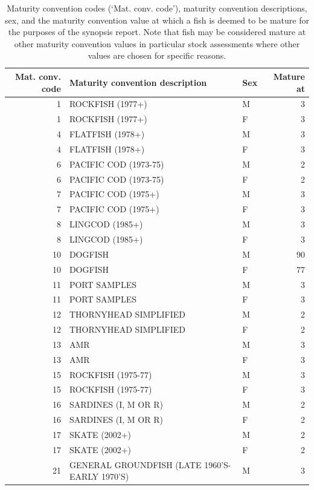 \documentclass[11pt]{book}\usepackage[]{graphicx}\usepackage[]{color}
\begin{document}
\begin{table}[ht]
\centering
\caption{Maturity convention codes (`Mat. conv. code'), maturity convention descriptions, sex, and the maturity convention value at which a fish is deemed to be mature for the purposes of the synopsis report. Note that fish may be considered mature at other maturity convention values in particular stock assessments where other values are chosen for specific reasons.} 
\begin{tabular}{rllr}
  \toprule
Mat. conv. code & Maturity convention description & Sex & Mature at \\ 
  \midrule
  1 & ROCKFISH (1977+) & M &   3 \\ 
    1 & ROCKFISH (1977+) & F &   3 \\ 
    4 & FLATFISH (1978+) & M &   3 \\ 
    4 & FLATFISH (1978+) & F &   3 \\ 
    6 & PACIFIC COD (1973-75) & M &   2 \\ 
    6 & PACIFIC COD (1973-75) & F &   2 \\ 
    7 & PACIFIC COD (1975+) & M &   3 \\ 
    7 & PACIFIC COD (1975+) & F &   3 \\ 
    8 & LINGCOD (1985+) & M &   3 \\ 
    8 & LINGCOD (1985+) & F &   3 \\ 
   10 & DOGFISH & M &  90 \\ 
   10 & DOGFISH & F &  77 \\ 
   11 & PORT SAMPLES & M &   3 \\ 
   11 & PORT SAMPLES & F &   3 \\ 
   12 & THORNYHEAD SIMPLIFIED & M &   2 \\ 
   12 & THORNYHEAD SIMPLIFIED & F &   2 \\ 
   13 & AMR & M &   3 \\ 
   13 & AMR & F &   3 \\ 
   15 & ROCKFISH (1975-77) & M &   3 \\ 
   15 & ROCKFISH (1975-77) & F &   3 \\ 
   16 & SARDINES (I, M OR R) & M &   2 \\ 
   16 & SARDINES (I, M OR R) & F &   2 \\ 
   17 & SKATE (2002+) & M &   2 \\ 
   17 & SKATE (2002+) & F &   2 \\ 
   21 & GENERAL GROUNDFISH (LATE 1960'S-EARLY 1970'S) & M &   3 \\ 

\end{tabular}
\end{table}
\end{document}
